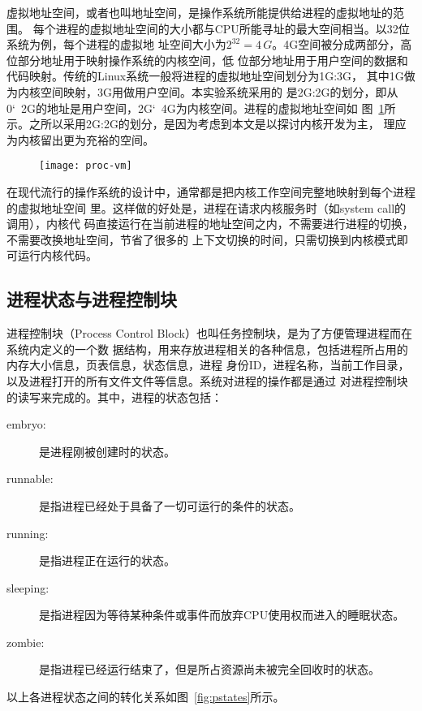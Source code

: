 \documentclass{swfuthesism}
\begin{document}
虚拟地址空间，或者也叫地址空间，是操作系统所能提供给进程的虚拟地址的范围\cite{zos}。
每个进程的虚拟地址空间的大小都与CPU所能寻址的最大空间相当。以32位系统为例，每个进程的虚拟地
址空间大小为$2^{32}=4\,G$。4G空间被分成两部分，高位部分地址用于映射操作系统的内核空间，低
位部分地址用于用户空间的数据和代码映射。传统的Linux系统一般将进程的虚拟地址空间划分为1G:3G，
其中1G做为内核空间映射，3G用做用户空间\cite{silberschatz11essentials}。本实验系统采用的
是2G:2G的划分，即从0\char`~2G的地址是用户空间，2G\char`~4G为内核空间。进程的虚拟地址空间如
图~\ref{fig:process-vm}所示。之所以采用2G:2G的划分，是因为考虑到本文是以探讨内核开发为主，
理应为内核留出更为充裕的空间。

\begin{figure}[!htb]
  \centering \texttt{[image: proc-vm]}
  \label{fig:process-vm}
\end{figure}
 
在现代流行的操作系统的设计中，通常都是把内核工作空间完整地映射到每个进程的虚拟地址空间
里\cite{love2010linux}。这样做的好处是，进程在请求内核服务时（如system call的调用），内核代
码直接运行在当前进程的地址空间之内，不需要进行进程的切换，不需要改换地址空间，节省了很多的
上下文切换的时间，只需切换到内核模式即可运行内核代码。

\subsection{进程状态与进程控制块}
\label{sec:proc}

进程控制块（Process Control Block）也叫任务控制块，是为了方便管理进程而在系统内定义的一个数
据结构，用来存放进程相关的各种信息，包括进程所占用的内存大小信息，页表信息，状态信息，进程
身份ID，进程名称，当前工作目录，以及进程打开的所有文件文件等信息。系统对进程的操作都是通过
对进程控制块的读写来完成的\cite{silberschatz10java}。其中，进程的状态包括：

\begin{description}
\item[embryo:] 是进程刚被创建时的状态。
\item[runnable:] 是指进程已经处于具备了一切可运行的条件的状态。
\item[running:] 是指进程正在运行的状态。
\item[sleeping:] 是指进程因为等待某种条件或事件而放弃CPU使用权而进入的睡眠状态。
\item[zombie:] 是指进程已经运行结束了，但是所占资源尚未被完全回收时的状态。
\end{description}
以上各进程状态之间的转化关系如图~\ref{fig:pstates}所示。
\end{document}
